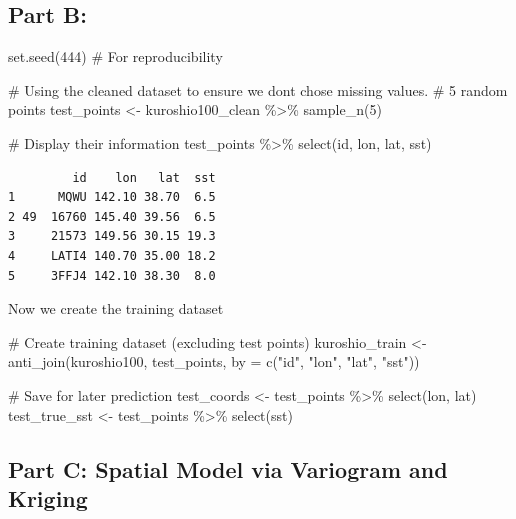 \documentclass[
  11pt,
]{article}
\newenvironment{Shaded}{\begin{snugshade}}{\end{snugshade}}
\newcommand{\AttributeTok}[1]{\textcolor[rgb]{0.40,0.45,0.13}{#1}}
\newcommand{\CommentTok}[1]{\textcolor[rgb]{0.37,0.37,0.37}{#1}}
\newcommand{\DecValTok}[1]{\textcolor[rgb]{0.68,0.00,0.00}{#1}}
\newcommand{\FunctionTok}[1]{\textcolor[rgb]{0.28,0.35,0.67}{#1}}
\newcommand{\NormalTok}[1]{\textcolor[rgb]{0.00,0.23,0.31}{#1}}
\newcommand{\OtherTok}[1]{\textcolor[rgb]{0.00,0.23,0.31}{#1}}
\newcommand{\SpecialCharTok}[1]{\textcolor[rgb]{0.37,0.37,0.37}{#1}}
\newcommand{\StringTok}[1]{\textcolor[rgb]{0.13,0.47,0.30}{#1}}
\begin{document}
\subsection{Part B:}\label{part-b}

\begin{Shaded}
\begin{Highlighting}[]
\FunctionTok{set.seed}\NormalTok{(}\DecValTok{444}\NormalTok{)  }\CommentTok{\# For reproducibility}

\CommentTok{\# Using the cleaned dataset to ensure we dont chose missing values.}
\CommentTok{\# 5 random points}
\NormalTok{test\_points }\OtherTok{\textless{}{-}}\NormalTok{ kuroshio100\_clean }\SpecialCharTok{\%\textgreater{}\%}
  \FunctionTok{sample\_n}\NormalTok{(}\DecValTok{5}\NormalTok{)}

\CommentTok{\# Display their information}
\NormalTok{test\_points }\SpecialCharTok{\%\textgreater{}\%}
  \FunctionTok{select}\NormalTok{(id, lon, lat, sst)}
\end{Highlighting}
\end{Shaded}

\begin{verbatim}
         id    lon   lat  sst
1      MQWU 142.10 38.70  6.5
2 49  16760 145.40 39.56  6.5
3     21573 149.56 30.15 19.3
4     LATI4 140.70 35.00 18.2
5     3FFJ4 142.10 38.30  8.0
\end{verbatim}

Now we create the training dataset

\begin{Shaded}
\begin{Highlighting}[]
\CommentTok{\# Create training dataset (excluding test points)}
\NormalTok{kuroshio\_train }\OtherTok{\textless{}{-}} \FunctionTok{anti\_join}\NormalTok{(kuroshio100, test\_points, }\AttributeTok{by =} \FunctionTok{c}\NormalTok{(}\StringTok{"id"}\NormalTok{, }\StringTok{"lon"}\NormalTok{, }\StringTok{"lat"}\NormalTok{, }\StringTok{"sst"}\NormalTok{))}

\CommentTok{\# Save for later prediction}
\NormalTok{test\_coords }\OtherTok{\textless{}{-}}\NormalTok{ test\_points }\SpecialCharTok{\%\textgreater{}\%} \FunctionTok{select}\NormalTok{(lon, lat)}
\NormalTok{test\_true\_sst }\OtherTok{\textless{}{-}}\NormalTok{ test\_points }\SpecialCharTok{\%\textgreater{}\%} \FunctionTok{select}\NormalTok{(sst)}
\end{Highlighting}
\end{Shaded}

\subsection{Part C: Spatial Model via Variogram and
Kriging}\label{part-c-spatial-model-via-variogram-and-kriging}
\end{document}
